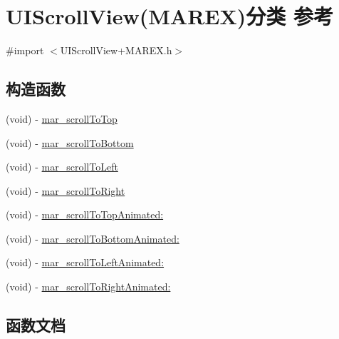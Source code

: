 \hypertarget{category_u_i_scroll_view_07_m_a_r_e_x_08}{}\section{U\+I\+Scroll\+View(M\+A\+R\+EX)分类 参考}
\label{category_u_i_scroll_view_07_m_a_r_e_x_08}


{\ttfamily \#import $<$U\+I\+Scroll\+View+\+M\+A\+R\+E\+X.\+h$>$}

\subsection*{构造函数}
\begin{DoxyCompactItemize}
\item 
(void) -\/ \hyperlink{category_u_i_scroll_view_07_m_a_r_e_x_08_a6133c32f365b283937625027106116c2}{mar\+\_\+scroll\+To\+Top}
\item 
(void) -\/ \hyperlink{category_u_i_scroll_view_07_m_a_r_e_x_08_aa992b9b25fedf52fec8abb73b691fdc8}{mar\+\_\+scroll\+To\+Bottom}
\item 
(void) -\/ \hyperlink{category_u_i_scroll_view_07_m_a_r_e_x_08_ae4bedf884899a044392bf3091d3d7302}{mar\+\_\+scroll\+To\+Left}
\item 
(void) -\/ \hyperlink{category_u_i_scroll_view_07_m_a_r_e_x_08_a5b6c35e27cdefda2997b44ce1fe17f20}{mar\+\_\+scroll\+To\+Right}
\item 
(void) -\/ \hyperlink{category_u_i_scroll_view_07_m_a_r_e_x_08_ae1b3801edd92064c707508ee05cbcd36}{mar\+\_\+scroll\+To\+Top\+Animated\+:}
\item 
(void) -\/ \hyperlink{category_u_i_scroll_view_07_m_a_r_e_x_08_a8ebb0387f4964681b9293590a2f7a1ad}{mar\+\_\+scroll\+To\+Bottom\+Animated\+:}
\item 
(void) -\/ \hyperlink{category_u_i_scroll_view_07_m_a_r_e_x_08_aa29b0572bfde20bb52099e00caeba8c9}{mar\+\_\+scroll\+To\+Left\+Animated\+:}
\item 
(void) -\/ \hyperlink{category_u_i_scroll_view_07_m_a_r_e_x_08_a4ed0f4d1c55a3c21ed6fef18d48f9475}{mar\+\_\+scroll\+To\+Right\+Animated\+:}
\end{DoxyCompactItemize}


\subsection{函数文档}
\mbox{\label{category_u_i_scroll_view_07_m_a_r_e_x_08_aa992b9b25fedf52fec8abb73b691fdc8}} 
